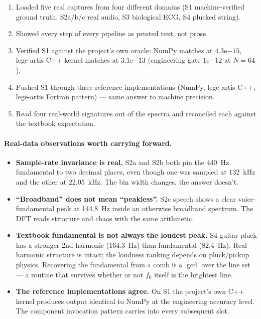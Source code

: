 \documentclass[11pt,a4paper,openany]{book}
\begin{document}
\begin{enumerate}[leftmargin=*,itemsep=0pt]
\item Loaded five real captures from four different domains (S1 machine-verified ground truth, S2a/b/c real audio, S3 biological ECG, S4 plucked string).
\item Showed every step of every pipeline as printed text, not prose.
\item Verified S1 against the project's own oracle: NumPy matches at $4.3\mathrm{e}{-15}$, lege-artis C++ kernel matches at $3.1\mathrm{e}{-13}$ (engineering gate $1\mathrm{e}{-12}$ at $N=64$).
\item Pushed S1 through three reference implementations (NumPy, lege-artis C++, lege-artis Fortran pattern) --- same answer to machine precision.
\item Read four real-world signatures out of the spectra and reconciled each against the textbook expectation.
\end{enumerate}

\paragraph{Real-data observations worth carrying forward.}
\begin{itemize}[leftmargin=*,itemsep=0pt]
\item \textbf{Sample-rate invariance is real.} S2a and S2b both pin
the 440~Hz fundamental to two decimal places, even though one was
sampled at $132$~kHz and the other at $22.05$~kHz. The bin width
changes, the answer doesn't.
\item \textbf{``Broadband'' does not mean ``peakless''.} S2c speech
shows a clear voice-fundamental peak at 144.8~Hz inside an otherwise
broadband spectrum. The DFT reads structure and chaos with the same
arithmetic.
\item \textbf{Textbook fundamental is not always the loudest peak.}
S4 guitar pluck has a stronger 2nd-harmonic (164.3~Hz) than
fundamental (82.4~Hz). Real harmonic structure is intact; the
loudness ranking depends on pluck/pickup physics. Recovering the
fundamental from a comb is a $\gcd$ over the line set --- a routine
that survives whether or not $f_0$ itself is the brightest line.
\item \textbf{The reference implementations agree.} On S1 the
project's own C++ kernel produces output identical to NumPy at the
engineering accuracy level. The component invocation pattern carries
into every subsequent slot.
\end{itemize}
\end{document}

